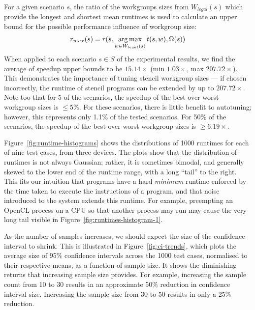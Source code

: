 \documentclass[nonatbib,preprint,9pt]{sigplanconf}
\begin{document}
For a given scenario $s$, the ratio of the workgroups sizes from
$W_{legal}(s)$ which provide the longest and shortest mean runtimes is
used to calculate an upper bound for the possible performance
influence of workgroup size:
%
\begin{equation}
r_{max}(s) = r(s, \operatorname*{arg\,max}_{w \in W_{legal}(s)} t(s,w), \Omega(s))
\end{equation}
%
When applied to each scenario $s \in S$ of the experimental results,
we find the average of speedup upper bounds to be $15.14\times$ (min
$1.03\times$, max $207.72\times$). This demonstrates the importance of
tuning stencil workgroup sizes --- if chosen incorrectly, the runtime
of stencil programs can be extended by up to $207.72\times$. Note too
that for 5 of the scenarios, the speedup of the best over worst
workgroup sizes is $\le 5\%$.
For these scenarios, there is little benefit to autotuning; however,
this represents only 1.1\% of the tested scenarios. For 50\% of the
scenarios, the speedup of the best over worst workgroup sizes is
$\ge 6.19\times$.



Figure~\ref{fig:runtime-histograms} shows the distributions of 1000
runtimes for each of nine test cases, from three devices. The plots
show that the distribution of runtimes is not always Gaussian; rather,
it is sometimes bimodal, and generally skewed to the lower end of the
runtime range, with a long ``tail'' to the right. This fits our
intuition that programs have a hard \emph{minimum} runtime enforced by
the time taken to execute the instructions of a program, and that
noise introduced to the system extends this runtime. For example,
preempting an OpenCL process on a CPU so that another process may run
may cause the very long tail visible in
Figure~\ref{fig:runtimes-histogram-1}.

As the number of samples increases, we
should expect the size of the confidence interval to shrink. This is
illustrated in Figure~\ref{fig:ci-trends}, which plots the average
size of 95\% confidence intervals across the 1000 test cases,
normalised to their respective means, as a function of sample
size. It shows the diminishing returns that increasing sample size
provides. For example, increasing the sample count from 10 to 30
results in an approximate 50\% reduction in confidence interval
size. Increasing the sample size from 30 to 50 results in only a
25\% reduction.
\end{document}
